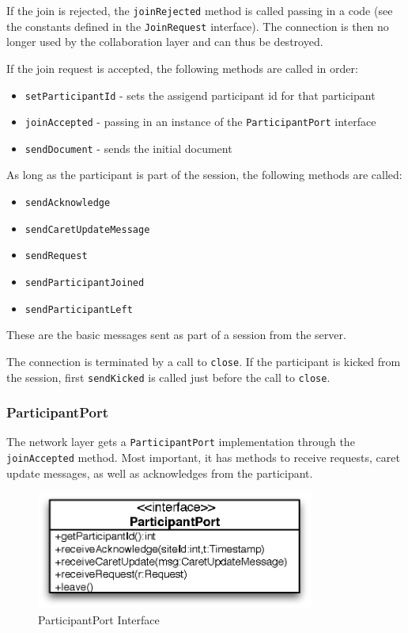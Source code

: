 If the join is rejected, the \texttt{joinRejected} method is called passing
in a code (see the constants defined in the \texttt{JoinRequest} interface).
The connection is then no longer used by the collaboration layer and can thus
be destroyed.

If the join request is accepted, the following methods are called in order:
\begin{itemize}
 \item \texttt{setParticipantId} - sets the assigend participant id for that participant
 \item \texttt{joinAccepted} - passing in an instance of the \texttt{ParticipantPort} interface
 \item \texttt{sendDocument} - sends the initial document
\end{itemize} 

As long as the participant is part of the session, the following methods
are called:
\begin{itemize}
 \item \texttt{sendAcknowledge}
 \item \texttt{sendCaretUpdateMessage}
 \item \texttt{sendRequest}
 \item \texttt{sendParticipantJoined}
 \item \texttt{sendParticipantLeft}
\end{itemize}

These are the basic messages sent as part of a session from the server.

The connection is terminated by a call to \texttt{close}. If the participant
is kicked from the session, first \texttt{sendKicked} is called just before
the call to \texttt{close}.


\subsubsection{ParticipantPort}
The network layer gets a \texttt{ParticipantPort} implementation through
the \texttt{joinAccepted} method. Most important, it has methods to receive
requests, caret update messages, as well as acknowledges from the participant.

\begin{figure}[H]
 \centering
 \includegraphics[width=9.13cm,height=3.88cm]{../images/finalreport/architecture_participantport_uml.eps}
 \caption{ParticipantPort Interface}
\end{figure}

